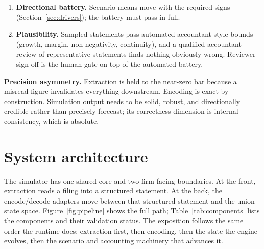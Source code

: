 \documentclass[11pt]{article}
\newcommand{\lead}[2]{\par\addvspace{5pt}\textbf{\textcolor{#1}{#2}}}
\begin{document}
\begin{enumerate}
  \item \textbf{Directional battery.} Scenario means move with the required signs (Section~\ref{sec:drivers}); the battery must pass in full.
  \item \textbf{Plausibility.} Sampled statements pass automated accountant-style bounds (growth, margin, non-negativity, continuity), and a qualified accountant review of representative statements finds nothing obviously wrong. Reviewer sign-off is the human gate on top of the automated battery.
\end{enumerate}

\lead{navytwo}{Precision asymmetry.} Extraction is held to the near-zero bar because a misread figure invalidates everything downstream. Encoding is exact by construction. Simulation output needs to be solid, robust, and directionally credible rather than precisely forecast; its correctness dimension is internal consistency, which is absolute.

\section{System architecture}
\label{sec:architecture}
The simulator has one shared core and two firm-facing boundaries. At the front, extraction reads a filing into a structured statement. At the back, the encode/decode adapters move between that structured statement and the union state space. Figure~\ref{fig:pipeline} shows the full path; Table~\ref{tab:components} lists the components and their validation status. The exposition follows the same order the runtime does: extraction first, then encoding, then the state the engine evolves, then the scenario and accounting machinery that advances it.
\end{document}
